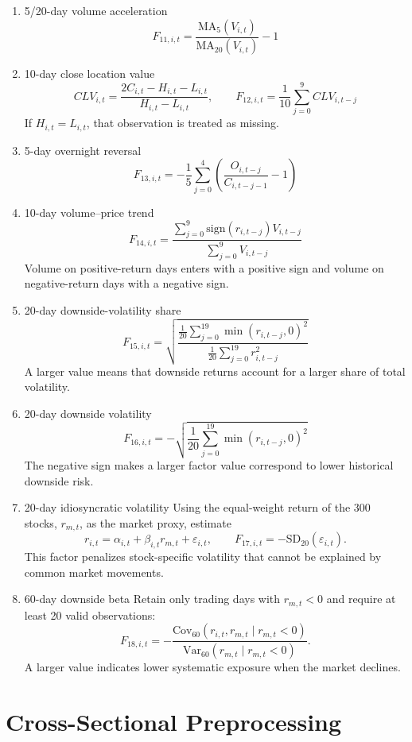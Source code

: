 \documentclass[a4paper,11pt,openany]{report}
\begin{document}
\begin{enumerate}[label=\roman*)]
    \item 5/20-day volume acceleration
    $$F_{11,i,t}=\frac{\mathrm{MA}_{5}(V_{i,t})}{\mathrm{MA}_{20}(V_{i,t})}-1$$

    \item 10-day close location value
    $$CLV_{i,t}=\frac{2C_{i,t}-H_{i,t}-L_{i,t}}{H_{i,t}-L_{i,t}},\qquad
    F_{12,i,t}=\frac{1}{10}\sum_{j=0}^{9}CLV_{i,t-j}$$
    If $H_{i,t}=L_{i,t}$, that observation is treated as missing.

    \item 5-day overnight reversal
    $$F_{13,i,t}=-\frac{1}{5}\sum_{j=0}^{4}\left(\frac{O_{i,t-j}}{C_{i,t-j-1}}-1\right)$$

    \item 10-day volume--price trend
    $$F_{14,i,t}=\frac{\sum_{j=0}^{9}\mathrm{sign}(r_{i,t-j})V_{i,t-j}}{\sum_{j=0}^{9}V_{i,t-j}}$$
    Volume on positive-return days enters with a positive sign and volume on negative-return days with a negative sign.

    \item 20-day downside-volatility share
    $$F_{15,i,t}=\sqrt{\frac{\frac{1}{20}\sum_{j=0}^{19}\min(r_{i,t-j},0)^2}{\frac{1}{20}\sum_{j=0}^{19}r_{i,t-j}^2}}$$
    A larger value means that downside returns account for a larger share of total volatility.

    \item 20-day downside volatility
    $$F_{16,i,t}=-\sqrt{\frac{1}{20}\sum_{j=0}^{19}\min(r_{i,t-j},0)^2}$$
    The negative sign makes a larger factor value correspond to lower historical downside risk.

    \item 20-day idiosyncratic volatility
    Using the equal-weight return of the 300 stocks, $r_{m,t}$, as the market proxy, estimate
    $$r_{i,t}=\alpha_{i,t}+\beta_{i,t}r_{m,t}+\varepsilon_{i,t},\qquad
    F_{17,i,t}=-\mathrm{SD}_{20}(\varepsilon_{i,t}).$$
    This factor penalizes stock-specific volatility that cannot be explained by common market movements.

    \item 60-day downside beta
    Retain only trading days with $r_{m,t}<0$ and require at least 20 valid observations:
    $$F_{18,i,t}=-\frac{\mathrm{Cov}_{60}(r_{i,t},r_{m,t}\mid r_{m,t}<0)}{\mathrm{Var}_{60}(r_{m,t}\mid r_{m,t}<0)}.$$
    A larger value indicates lower systematic exposure when the market declines.
\end{enumerate}

\section{Cross-Sectional Preprocessing}
\end{document}
